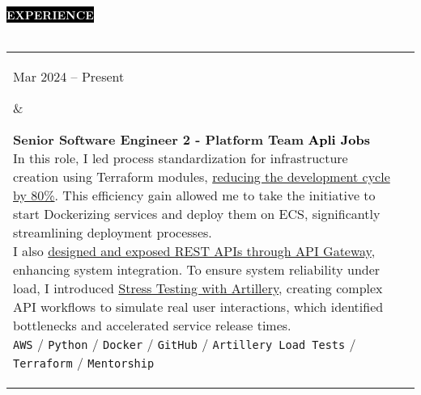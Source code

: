 \documentclass[10pt,A4]{article}
\makeatletter
\newcounter{a}
\newcounter{b}
\newcounter{c}
\newcommand{\cvsection}[1] {
	\textcolor{white}{\MakeUppercase{\textbf{#1}}}
}
\newcommand{\cvsect}[1]{
	\colorbox{black}{{\cvsection{#1}}}\\\\%
}
\newenvironment{entrylist}{%
	\begin{tabular*}{\textwidth}[t]{@{\extracolsep{\fill}}ll}
	}{%
	\end{tabular*}
}
\newcommand{\entry}[4]{%
	\parbox[t]{3.5cm}{%
		#1%
	}%
	&\parbox[t]{14cm}{%
		\textbf{#2}%
		\hfill%
		{\footnotesize \textbf{\textcolor{black}{#3}}}\\%
		#4%
	}\\\\}
\newcommand{\slashsep}{
	\hspace{2mm}/\hspace{2mm}
}
\makeatother
\begin{document}
	\cvsect{Experience}
	\begin{entrylist}
		\entry
		{Mar 2024 – Present}
		{Senior Software Engineer 2 - Platform Team}
		{Apli Jobs} %
		{In this role, I led process standardization for infrastructure creation using Terraform modules,
		\underline{reducing the development cycle by 80\%}. This efficiency gain allowed me to take the initiative to
		start Dockerizing services and deploy them on ECS, significantly streamlining deployment processes.\\
		\hfil\break
		I also \underline{designed and exposed REST APIs through API Gateway}, enhancing system integration. To ensure
		system reliability under load, I introduced \underline{Stress Testing with Artillery}, creating complex API
		workflows to simulate real user interactions, which identified bottlenecks and accelerated service
		release times.\\
			\texttt{AWS}\slashsep\texttt{Python}\slashsep\texttt{Docker}\slashsep\texttt{GitHub}\slashsep\texttt{Artillery Load Tests}\slashsep\texttt{Terraform}\slashsep\texttt{Mentorship}}
		\entry
		{Jan 2022 – Mar 2022}
		{Software Engineer - Cloud Team}
		{Apli Jobs}
		{As the first and only Cloud Engineer during my initial 6 months at Apli, I spearheaded the design
		and \underline{implementation of cloud-based architecture for cross-team projects}, collaborating with Data Science,
		Product, and Engineering teams. Utilizing AWS services such as EMR, ECS, DynamoDB, Lambda, AWS Backup,
		RDS, and Redis, I also successfully implemented cost optimization mechanisms that \underline{reduced the company's costs in around 10\% for the first year}.\\
		\hfil\break
		I initiated and led internal efforts to bolster company culture and enforce security protocols.
		I was a \underline{key member of the committee that introduced the on-call program} to the Engineering team, which
		resulted in a response time against incident of less than 4 hours. I also led the ISO audit and
		certification process for cloud infrastructure controls, ensuring our architecture met the highest standards of security, 
		scalability, and reliability, which culminated in achieving ISO 27k1.\\
		\hfil\break
		As the team expanded, \underline{I took on a mentor and leadership role}, establishing processes that improved
		code quality, including enhanced documentation, automated security checks in CI/CD, and regular
		knowledge-sharing meetings.\\
}
\end{entrylist}
\end{document}
